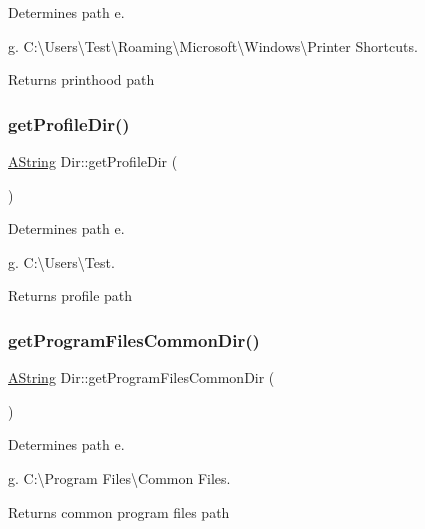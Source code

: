 Determines path e. 

g. C\+:\textbackslash{}\+Users\textbackslash{}\+Test\textbackslash{}\+Roaming\textbackslash{}\+Microsoft\textbackslash{}\+Windows\textbackslash{}\+Printer Shortcuts. \begin{DoxyReturn}{Returns}
printhood path 
\end{DoxyReturn}
\mbox{\label{class_dir_ab68e6294a2441934672c6c6348df1e74}} 
\subsubsection{\texorpdfstring{getProfileDir()}{getProfileDir()}}
{\footnotesize\ttfamily \mbox{\hyperlink{class_a_string}{A\+String}} Dir\+::get\+Profile\+Dir (\begin{DoxyParamCaption}{ }\end{DoxyParamCaption})\hspace{0.3cm}{\ttfamily [static]}}



Determines path e. 

g. C\+:\textbackslash{}\+Users\textbackslash{}\+Test. \begin{DoxyReturn}{Returns}
profile path 
\end{DoxyReturn}
\mbox{\label{class_dir_a7348309552c3286c53000f645e4545e8}} 
\subsubsection{\texorpdfstring{getProgramFilesCommonDir()}{getProgramFilesCommonDir()}}
{\footnotesize\ttfamily \mbox{\hyperlink{class_a_string}{A\+String}} Dir\+::get\+Program\+Files\+Common\+Dir (\begin{DoxyParamCaption}{ }\end{DoxyParamCaption})\hspace{0.3cm}{\ttfamily [static]}}



Determines path e. 

g. C\+:\textbackslash{}\+Program Files\textbackslash{}\+Common Files. \begin{DoxyReturn}{Returns}
common program files path 
\end{DoxyReturn}
\mbox{\label{class_dir_ab19d6650f6e56f91c3b16b9523bc70d0}} 
